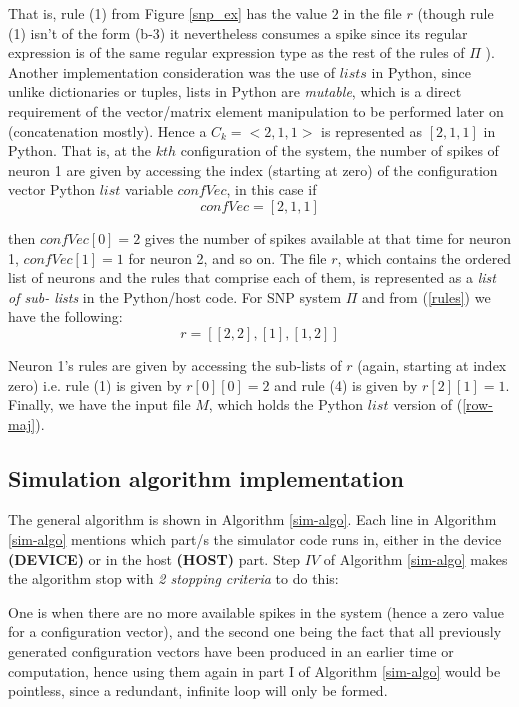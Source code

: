 \documentclass{svmultm}
\begin{document}
That is, rule (1) from Figure \ref{snp_ex} has the value $2$ in the file $r$ (though rule (1)
isn't of the form (b-3) it nevertheless consumes a spike since
its regular expression is of the same regular expression type
as the rest of the rules of ${\Pi}$ ). Another implementation
consideration was the use of $lists$ in Python, since unlike
dictionaries or tuples, lists in Python are  \textit{mutable}, which is a
direct requirement of the vector/matrix element
manipulation to be performed later on (concatenation
mostly). Hence a $C_k = <2, 1, 1>$ is
represented as $[ 2, 1, 1 ]$ in Python. That is, at the $kth$
configuration of the system, the number of spikes of neuron
1 are given by accessing the index (starting at zero) of the
configuration vector Python $list$ variable $confVec$, in this case if
\begin{equation}\label{confvec}
confVec = [ 2, 1, 1 ]
\end{equation}
	
then $confVec[ 0 ] = 2$ gives the number of spikes available at
that time for neuron 1, $confVec[ 1 ] = 1$ for neuron 2, and so
on. The file $r$, which contains the ordered list of neurons and
the rules that comprise each of them, is represented as a \textit{list of sub-
lists} in the Python/host code. For SNP system ${\Pi}$ and from (\ref{rules}) we have the
following:
\begin{equation}\label{rule-list}
r = [ [ 2, 2 ], [ 1 ], [ 1, 2 ] ]
\end{equation}

Neuron 1's rules are given by accessing the sub-lists of $r$
(again, starting at index zero) i.e. rule (1) is given by $r[ 0 ][ 0 ]
= 2$ and rule (4) is given by $r[ 2 ][ 1 ] = 1$.
Finally, we have the input file $M$, which holds the Python $list$ version of (\ref{row-maj}).

\subsection{Simulation algorithm implementation}\label{snp-sim-algo}

	
The general algorithm is shown in Algorithm \ref{sim-algo}. {Each line in Algorithm \ref{sim-algo} mentions
which part/s the simulator code runs in, either in the device \textbf{(DEVICE)} or in the host \textbf{(HOST)} part.} 
Step $IV$ of Algorithm \ref{sim-algo} makes
the algorithm stop with \textit{2 stopping criteria} to do this:

One is when there are no more available spikes in the system (hence a
zero value for a configuration vector), and the second one
being the fact that all previously generated configuration
vectors have been produced in an earlier time or
computation, hence using them again in part I of Algorithm \ref{sim-algo} would be pointless, since a
redundant, infinite loop will only be formed.
\end{document}
